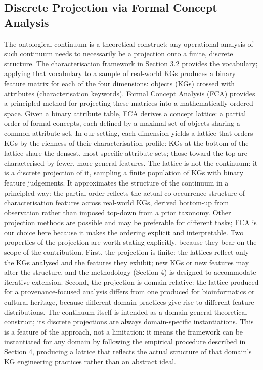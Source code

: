 \documentclass[runningheads]{llncs}
\newcommand{\add}[1]{\textcolor{addedcolor}{#1}}
\begin{document}
\subsection{Discrete Projection via Formal Concept Analysis
}
\add{The ontological continuum is a theoretical construct; any operational analysis of such continuum needs to necessarily be a projection onto a finite, discrete structure. The characterisation framework in Section 3.2 provides the vocabulary; applying that vocabulary to a sample of real-world KGs produces a binary feature matrix for each of the four dimensions: objects (KGs) crossed with attributes (characterisation keywords). Formal Concept Analysis (FCA) \cite{ganter1999formal} provides a principled method for projecting these matrices into a mathematically ordered space.
Given a binary attribute table, FCA derives a concept lattice: a partial order of formal concepts, each defined by a maximal set of objects sharing a common attribute set. In our setting, each dimension yields a lattice that orders KGs by the richness of their characterisation profile: KGs at the bottom of the lattice share the densest, most specific attribute sets; those toward the top are characterised by fewer, more general features. The lattice is not the continuum: it is a discrete projection of it, sampling a finite population of KGs with binary feature judgements. It approximates the structure of the continuum in a principled way: the partial order reflects the actual co-occurrence structure of characterisation features across real-world KGs, derived bottom-up from observation rather than imposed top-down from a prior taxonomy. Other projection methods are possible and may be preferable for different tasks; FCA is our choice here because it makes the ordering explicit and interpretable.}
\add{Two properties of the projection are worth stating explicitly, because they bear on the scope of the contribution. First, the projection is finite: the lattices reflect only the KGs analysed and the features they exhibit; new KGs or new features may alter the structure, and the methodology (Section 4) is designed to accommodate iterative extension. Second, the projection is domain-relative: the lattice produced for a provenance-focused analysis differs from one produced for bioinformatics or cultural heritage, because different domain practices give rise to different feature distributions. The continuum itself is intended as a domain-general theoretical construct; its discrete projections are always domain-specific instantiations. This is a feature of the approach, not a limitation: it means the framework can be instantiated for any domain by following the empirical procedure described in Section 4, producing a lattice that reflects the actual structure of that domain's KG engineering practices rather than an abstract ideal.}
\end{document}
